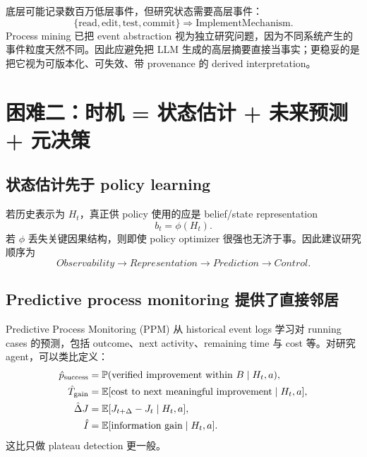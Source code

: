 \documentclass[11pt,a4paper]{ctexart}
\newcommand{\E}{\mathbb{E}}
\newcommand{\Pp}{\mathbb{P}}
\begin{document}
底层可能记录数百万低层事件，但研究状态需要高层事件：
\begin{equation}
 \{\text{read},\text{edit},\text{test},\text{commit}\}\Rightarrow\text{ImplementMechanism}.
\end{equation}
Process mining 已把 event abstraction 视为独立研究问题，因为不同系统产生的事件粒度天然不同\parencite{diba2021eventabstraction}。因此应避免把 LLM 生成的高层摘要直接当事实；更稳妥的是把它视为可版本化、可失效、带 provenance 的 derived interpretation。

\section{困难二：时机 = 状态估计 + 未来预测 + 元决策}

\subsection{状态估计先于 policy learning}

若历史表示为 $H_t$，真正供 policy 使用的应是 belief/state representation
\begin{equation}
 b_t=\phi(H_t).
\end{equation}
若 $\phi$ 丢失关键因果结构，则即使 policy optimizer 很强也无济于事。因此建议研究顺序为
\begin{equation}
\boxed{Observability\to Representation\to Prediction\to Control.}
\end{equation}

\subsection{Predictive process monitoring 提供了直接邻居}

Predictive Process Monitoring (PPM) 从 historical event logs 学习对 running cases 的预测，包括 outcome、next activity、remaining time 与 cost 等\parencite{francescomarino2024ppm,verenich2019remaining}。对研究 agent，可以类比定义：
\begin{align}
\hat p_{\rm success} &= \Pp(\text{verified improvement within }B\mid H_t,a),\\
\hat T_{\rm gain} &= \E[\text{cost to next meaningful improvement}\mid H_t,a],\\
\hat \Delta J &= \E[J_{t+\Delta}-J_t\mid H_t,a],\\
\hat I &= \E[\text{information gain}\mid H_t,a].
\end{align}
这比只做 plateau detection 更一般。
\end{document}
